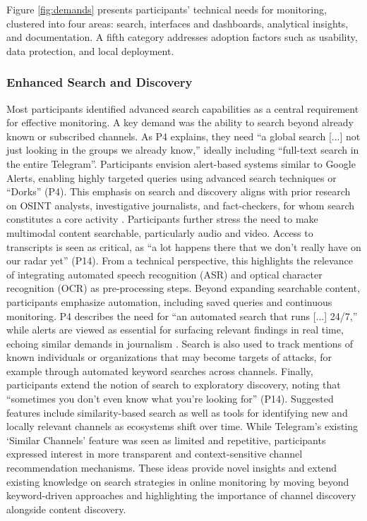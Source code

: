 \documentclass[acmsmall]{acmart}
\begin{document}
Figure \ref{fig:demands} presents participants’ technical needs for monitoring, clustered into four areas: search, interfaces and dashboards, analytical insights, and documentation. A fifth category addresses adoption factors such as usability, data protection, and local deployment. 


\subsubsection{Enhanced Search and Discovery} 
\label{sssec:enhanced_search}Most participants identified advanced search capabilities as a central requirement for effective monitoring. A key demand was the ability to search beyond already known or subscribed channels. As P4 explains, they need ``a global search [...] not just looking in the groups we already know,'' ideally including ``full-text search in the entire Telegram''. Participants envision alert-based systems similar to Google Alerts, enabling highly targeted queries using advanced search techniques or ``Dorks'' (P4).
This emphasis on search and discovery aligns with prior research on OSINT analysts, investigative journalists, and fact-checkers, for whom search constitutes a core activity \cite{mukhopadhyay_osint_2024,mckeown_investigating_2014,beers_examining_2020,juneja_human_2022}.
Participants further stress the need to make multimodal content searchable, particularly audio and video. Access to transcripts is seen as critical, as ``a lot happens there that we don't really have on our radar yet'' (P14). From a technical perspective, this highlights the relevance of integrating automated speech recognition (ASR) and optical character recognition (OCR) as pre-processing steps.
Beyond expanding searchable content, participants emphasize automation, including saved queries and continuous monitoring. P4 describes the need for ``an automated search that runs [...] 24/7,'' while alerts are viewed as essential for surfacing relevant findings in real time, echoing similar demands in journalism \cite{cifliku_save_2025}. Search is also used to track mentions of known individuals or organizations that may become targets of attacks, for example through automated keyword searches across channels.
Finally, participants extend the notion of search to exploratory discovery, noting that ``sometimes you don't even know what you’re looking for'' (P14). Suggested features include similarity-based search as well as tools for identifying new and locally relevant channels as ecosystems shift over time. While Telegram's existing `Similar Channels' feature was seen as limited and repetitive, participants expressed interest in more transparent and context-sensitive channel recommendation mechanisms. 
These ideas provide novel insights and extend existing knowledge on search strategies in online monitoring by moving beyond keyword-driven approaches and highlighting the importance of channel discovery alongside content discovery.
\end{document}
